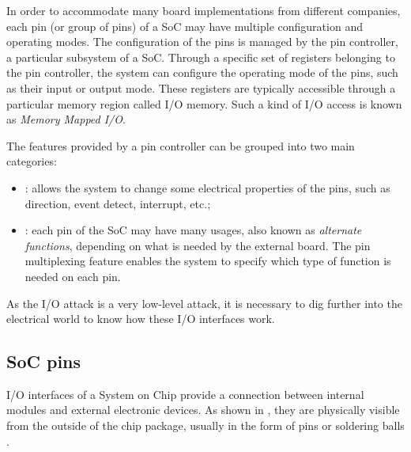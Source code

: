 In order to accommodate many board implementations from different companies, each pin (or group of pins) of a SoC may have multiple configuration and operating modes.
The configuration of the pins is managed by the pin controller, a particular subsystem of a SoC.
Through a specific set of registers belonging to the pin controller, the system can configure the operating mode of the pins, such as their input or output mode.
These registers are typically accessible through a particular memory region called I/O memory. Such a kind of I/O access is known as \emph{Memory Mapped I/O}.

The features provided by a pin controller can be grouped into two main categories:
\begin{itemize}
	\item {}: allows the system to change some electrical properties of the pins, such as direction, event detect, interrupt, etc.;
	\item {}: each pin of the SoC may have many usages, also known as \emph{alternate functions}, depending on what is needed by the external board.
		The pin multiplexing feature enables the system to specify which type of function is needed on each pin.
\end{itemize}

As the I/O attack is a very low-level attack, it is necessary to dig further into the electrical world to know how these I/O interfaces work.


\subsection{SoC pins}
\label{sec:iopins}

I/O interfaces of a System on Chip provide a connection between internal modules and external electronic devices.
As shown in \myfig{\ref{fig:chips}}, they are physically visible from the outside of the chip package,
usually in the form of pins  or soldering balls .

